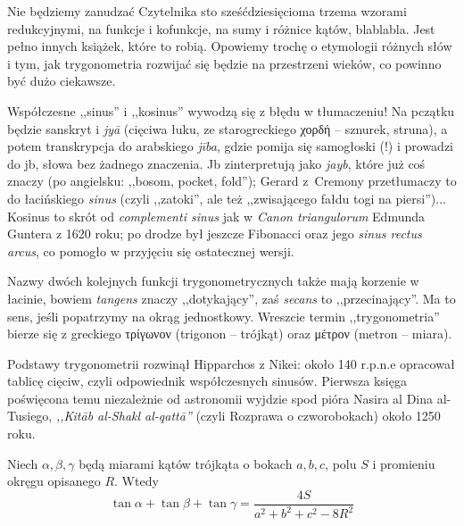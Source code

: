 Nie będziemy zanudzać Czytelnika sto sześćdziesięcioma trzema wzorami redukcyjnymi, na funkcje i kofunkcje, na sumy i różnice kątów, blablabla.
Jest pełno innych książek, które to robią.
Opowiemy trochę o etymologii różnych słów i tym, jak trygonometria rozwijać się będzie na przestrzeni wieków, co powinno być dużo ciekawsze.

Współczesne ,,sinus'' i ,,kosinus'' wywodzą się z błędu w tłumaczeniu!
Na pczątku będzie sanskryt i \emph{jyā} (cięciwa łuku, ze starogreckiego χορδή -- sznurek, struna), a potem transkrypcja do arabskiego \emph{jība}, gdzie pomija się samogłoski (!) i prowadzi do jb, słowa bez żadnego znaczenia. %
Jb zinterpretują jako \emph{jayb}, które już coś znaczy (po angielsku: ,,bosom, pocket, fold''); Gerard z~Cremony przetłumaczy to do łacińskiego \emph{sinus} (czyli ,,zatoki'', ale też ,,zwisającego fałdu togi na piersi'')...
Kosinus to skrót od \emph{complementi sinus} jak w \emph{Canon triangulorum} Edmunda Guntera z 1620 roku; po drodze był jeszcze Fibonacci oraz jego \emph{sinus rectus arcus}, co pomogło w przyjęciu się ostatecznej wersji.

Nazwy dwóch kolejnych funkcji trygonometrycznych także mają korzenie w łacinie, bowiem \emph{tangens} znaczy ,,dotykający'', zaś \emph{secans} to ,,przecinający''.
Ma to sens, jeśli popatrzymy na okrąg jednostkowy.
Wreszcie termin ,,trygonometria'' bierze się z greckiego τρίγωνον (trigonon -- trójkąt) oraz μέτρον (metron -- miara).

Podstawy trygonometrii rozwinął Hipparchos z Nikei: około 140 r.p.n.e opracował tablicę cięciw, czyli odpowiednik współczesnych sinusów.
Pierwsza księga poświęcona temu niezależnie od astronomii wyjdzie spod pióra Nasira al Dina al-Tusiego, \emph{,,Kitāb al-Shakl al-qattā''} (czyli Rozprawa o czworobokach) około 1250 roku. %

\begin{proposition}
	Niech $\alpha, \beta, \gamma$ będą miarami kątów trójkąta o bokach $a, b, c$, polu $S$ i promieniu okręgu opisanego $R$.
	Wtedy
	\begin{equation}
		\tan \alpha + \tan \beta + \tan \gamma = \frac{4S}{a^2 + b^2 + c^2 - 8R^2}
	\end{equation}
\end{proposition}

